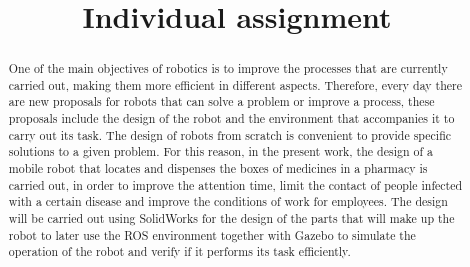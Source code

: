 \documentclass{article}
\begin{document}
\renewcommand{\footrulewidth}{1pt}
\renewcommand{\tablename}{Tabla}
\author{}%
\title{Individual assignment}
\date{}
\maketitle
\begin{abstract}
One of the main objectives of robotics is to improve the processes that are currently carried out, making them more efficient in different aspects. Therefore, every day there are new proposals for robots that can solve a problem or improve a process, these proposals include the design of the robot and the environment that accompanies it to carry out its task.
The design of robots from scratch is convenient to provide specific solutions to a given problem. For this reason, in the present work, the design of a mobile robot that locates and dispenses the boxes of medicines in a pharmacy is carried out, in order to improve the attention time, limit the contact of people infected with a certain disease and improve the conditions of work for employees.
The design will be carried out using SolidWorks for the design of the parts that will make up the robot to later use the ROS environment together with Gazebo to simulate the operation of the robot and verify if it performs its task efficiently.
\end{abstract}
\end{document}
